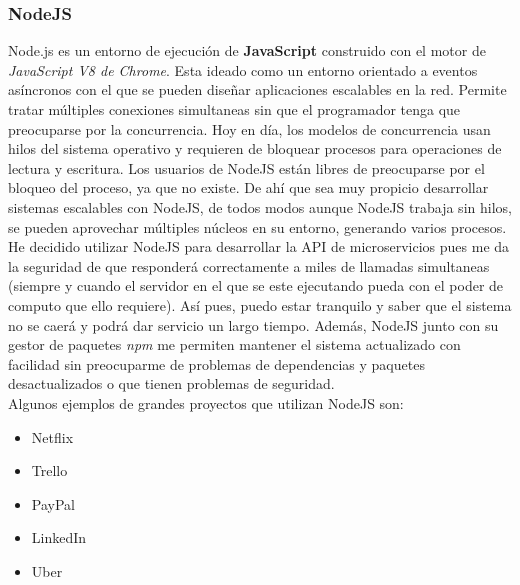 \subsubsection{NodeJS}
Node.js\cite{nodejs} es un entorno de ejecución de \textbf{JavaScript} construido con el motor de \emph{JavaScript V8 de Chrome}. Esta ideado como un entorno orientado a eventos asíncronos con el que se pueden diseñar aplicaciones escalables en la red. Permite tratar múltiples conexiones simultaneas sin que el programador tenga que preocuparse por la concurrencia. Hoy en día, los modelos de concurrencia usan hilos del sistema operativo y requieren de bloquear procesos para operaciones de lectura y escritura. Los usuarios de NodeJS están libres de preocuparse por el bloqueo del proceso, ya que no existe. De ahí que sea muy propicio desarrollar sistemas escalables con NodeJS, de todos modos aunque NodeJS trabaja sin hilos, se pueden aprovechar múltiples núcleos en su entorno, generando varios procesos. \\

He decidido utilizar NodeJS para desarrollar la API de microservicios pues me da la seguridad de que responderá correctamente a miles de llamadas simultaneas (siempre y cuando el servidor en el que se este ejecutando pueda con el poder de computo que ello requiere). Así pues, puedo estar tranquilo y saber que el sistema no se caerá y podrá dar servicio un largo tiempo. Además, NodeJS junto con su gestor de paquetes \emph{npm} me permiten mantener el sistema actualizado con facilidad sin preocuparme de problemas de dependencias y paquetes desactualizados o que tienen problemas de seguridad. \\

Algunos ejemplos de grandes proyectos que utilizan NodeJS son:
\begin{itemize}
\item Netflix
\item Trello
\item PayPal
\item LinkedIn
\item Uber
\end{itemize}

